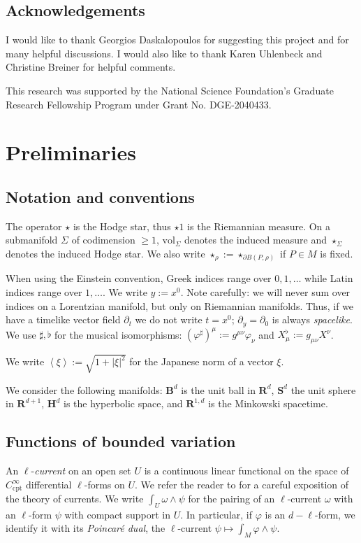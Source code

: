 \documentclass[reqno,11pt]{amsart}
\newcommand{\RR}{\mathbf{R}}
\newcommand{\Hyp}{\mathbf H}
\newcommand{\Sph}{\mathbf S}
\newcommand{\Ball}{\mathbf{B}}
\newcommand{\vol}{\mathrm{vol}}
\newcommand{\dfn}[1]{\emph{#1}\index{#1}}
\newcommand{\cpt}{\mathrm{cpt}}
\def\Japan#1{\left \langle #1 \right \rangle}
\theoremstyle{definition}
\numberwithin{equation}{section}
\begin{document}

\subsection{Acknowledgements}
I would like to thank Georgios Daskalopoulos for suggesting this project and for many helpful discussions.
I would also like to thank Karen Uhlenbeck and Christine Breiner for helpful comments.

This research was supported by the National Science Foundation's Graduate Research Fellowship Program under Grant No. DGE-2040433.



\section{Preliminaries}\label{Prelims}
\subsection{Notation and conventions}
The operator $\star$ is the Hodge star, thus $\star 1$ is the Riemannian measure.
On a submanifold $\Sigma$ of codimension $\geq 1$, $\vol_\Sigma$ denotes the induced measure and $\star_\Sigma$ denotes the induced Hodge star. We also write $\star_\rho := \star_{\partial B(P, \rho)}$ if $P \in M$ is fixed.

When using the Einstein convention, Greek indices range over $0, 1, \dots$ while Latin indices range over $1, \dots$.
We write $y := x^0$.
Note carefully: we will never sum over indices on a Lorentzian manifold, but only on Riemannian manifolds.
Thus, if we have a timelike vector field $\partial_t$ we do not write $t = x^0$; $\partial_y = \partial_0$ is always \emph{spacelike}.
We use $\sharp, \flat$ for the musical isomorphisms: $(\varphi^\sharp)^\mu := g^{\mu \nu} \varphi_\nu$ and $X^\flat_\mu := g_{\mu \nu} X^\nu$.

We write $\Japan \xi := \sqrt{1 + |\xi|^2}$ for the Japanese norm of a vector $\xi$.

We consider the following manifolds: $\Ball^d$ is the unit ball in $\RR^d$, $\Sph^d$ the unit sphere in $\RR^{d + 1}$, $\Hyp^d$ is the hyperbolic space, and $\RR^{1, d}$ is the Minkowski spacetime.

\subsection{Functions of bounded variation}
An $\ell$-\dfn{current} on an open set $U$ is a continuous linear functional on the space of $C^\infty_\cpt$ differential $\ell$-forms on $U$.
We refer the reader to \cite{simon1983GMT} for a careful exposition of the theory of currents.
We write $\int_U \omega \wedge \psi$ for the pairing of an $\ell$-current $\omega$ with an $\ell$-form $\psi$ with compact support in $U$.
In particular, if $\varphi$ is an $d-\ell$-form, we identify it with its \dfn{Poincar\'e dual}, the $\ell$-current $\psi \mapsto \int_M \varphi \wedge \psi$.
\end{document}
